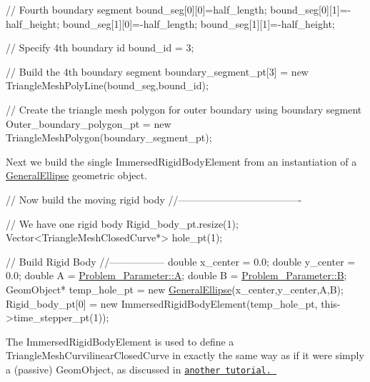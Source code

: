\begin{DoxyCodeInclude}
 \textcolor{comment}{// Fourth boundary segment}
 bound\_seg[0][0]=half\_length;
 bound\_seg[0][1]=-half\_height;
 bound\_seg[1][0]=-half\_length;
 bound\_seg[1][1]=-half\_height;

 \textcolor{comment}{// Specify 4th boundary id}
 bound\_id = 3;

 \textcolor{comment}{// Build the 4th boundary segment}
 boundary\_segment\_pt[3] = \textcolor{keyword}{new} TriangleMeshPolyLine(bound\_seg,bound\_id);
  
 \textcolor{comment}{// Create the triangle mesh polygon for outer boundary using boundary segment}
 Outer\_boundary\_polygon\_pt = \textcolor{keyword}{new} TriangleMeshPolygon(boundary\_segment\_pt);

\end{DoxyCodeInclude}


Next we build the single {\ttfamily Immersed\+Rigid\+Body\+Element} from an instantiation of a {\ttfamily \hyperlink{classGeneralEllipse}{General\+Ellipse}} geometric object.


\begin{DoxyCodeInclude}

 \textcolor{comment}{// Now build the moving rigid body}
 \textcolor{comment}{//-------------------------------------}

 \textcolor{comment}{// We have one rigid body}
 Rigid\_body\_pt.resize(1);
 Vector<TriangleMeshClosedCurve*> hole\_pt(1);

 \textcolor{comment}{// Build Rigid Body}
 \textcolor{comment}{//-----------------}
 \textcolor{keywordtype}{double} x\_center = 0.0;
 \textcolor{keywordtype}{double} y\_center = 0.0;
 \textcolor{keywordtype}{double} A = \hyperlink{namespaceProblem__Parameter_a23071148de0fea3597c2a7eb848320b6}{Problem\_Parameter::A};
 \textcolor{keywordtype}{double} B = \hyperlink{namespaceProblem__Parameter_ac2362a46222574a21338a113e2bee27e}{Problem\_Parameter::B};
 GeomObject* temp\_hole\_pt = \textcolor{keyword}{new} \hyperlink{classGeneralEllipse}{GeneralEllipse}(x\_center,y\_center,A,B);
 Rigid\_body\_pt[0] = \textcolor{keyword}{new} ImmersedRigidBodyElement(temp\_hole\_pt,
                                                 this->time\_stepper\_pt(1));

\end{DoxyCodeInclude}


The {\ttfamily Immersed\+Rigid\+Body\+Element} is used to define a {\ttfamily Triangle\+Mesh\+Curvilinear\+Closed\+Curve} in exactly the same way as if it were simply a (passive) {\ttfamily Geom\+Object}, as discussed in \href{../../../../doc/meshes/mesh_from_inline_triangle/html/index.html}{\tt another tutorial. }


